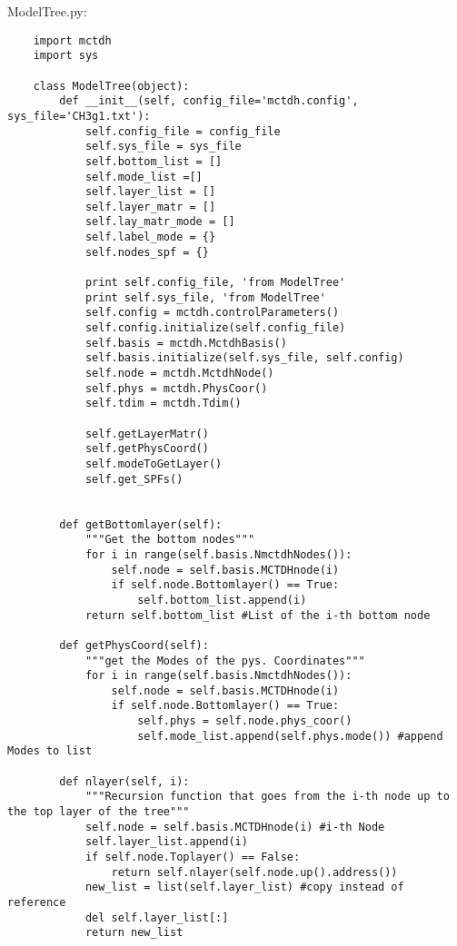 ModelTree.py:

\begin{verbatim}
    import mctdh
    import sys
    
    class ModelTree(object):
        def __init__(self, config_file='mctdh.config', sys_file='CH3g1.txt'):
            self.config_file = config_file
            self.sys_file = sys_file
            self.bottom_list = []
            self.mode_list =[]
            self.layer_list = []
            self.layer_matr = []
            self.lay_matr_mode = []
            self.label_mode = {}
            self.nodes_spf = {}
    
            print self.config_file, 'from ModelTree'
            print self.sys_file, 'from ModelTree'
            self.config = mctdh.controlParameters()
            self.config.initialize(self.config_file)
            self.basis = mctdh.MctdhBasis()
            self.basis.initialize(self.sys_file, self.config)
            self.node = mctdh.MctdhNode()
            self.phys = mctdh.PhysCoor()
            self.tdim = mctdh.Tdim()
    
            self.getLayerMatr()
            self.getPhysCoord()
            self.modeToGetLayer()
            self.get_SPFs()
    
    
        def getBottomlayer(self):
            """Get the bottom nodes"""
            for i in range(self.basis.NmctdhNodes()):
                self.node = self.basis.MCTDHnode(i)
                if self.node.Bottomlayer() == True:
                    self.bottom_list.append(i)
            return self.bottom_list #List of the i-th bottom node
    
        def getPhysCoord(self):
            """get the Modes of the pys. Coordinates"""
            for i in range(self.basis.NmctdhNodes()):
                self.node = self.basis.MCTDHnode(i)
                if self.node.Bottomlayer() == True:
                    self.phys = self.node.phys_coor()
                    self.mode_list.append(self.phys.mode()) #append Modes to list
    
        def nlayer(self, i):
            """Recursion function that goes from the i-th node up to the top layer of the tree"""
            self.node = self.basis.MCTDHnode(i) #i-th Node
            self.layer_list.append(i)
            if self.node.Toplayer() == False:
                return self.nlayer(self.node.up().address())
            new_list = list(self.layer_list) #copy instead of reference
            del self.layer_list[:]
            return new_list
    

\end{verbatim}
